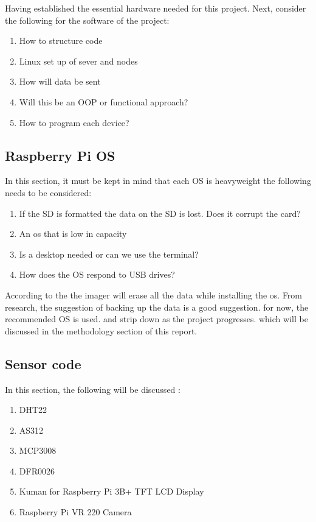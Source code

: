 
Having established the essential hardware needed for this project. Next, consider the following  for the software of the  project:
	\begin{enumerate}
	    \item How to structure code 
	    \item Linux set up of sever and nodes
	    \item How will data be sent
	    \item Will this be an OOP or functional approach?
	    \item How to program each device?
	\end{enumerate}
	\subsection{Raspberry Pi OS}
	\label{pi os}
	In this section, it must be kept in mind  that each OS is  heavyweight the following needs to be considered:
	\begin{enumerate}
		\item If the SD is formatted the data on the SD is lost. Does it corrupt the card?
		\item An os that is low in capacity 
		\item Is a desktop needed or can we use the terminal?
		\item How does the OS  respond to USB drives?
	\end{enumerate}

	According to the \cite{projects} the imager will erase all the data while installing the os. From research, the suggestion of backing up the data is a good suggestion.
	for now, the recommended OS is used. and strip down as the project progresses. which will be discussed in the methodology section of this report.
	
	\subsection{Sensor code}
	In this section, the following will be discussed :
	\begin{enumerate}
		\item DHT22
		\item AS312
		\item MCP3008
		\item DFR0026
		\item Kuman for Raspberry Pi 3B+ TFT LCD Display
		\item Raspberry Pi VR 220 Camera 
	\end{enumerate}

